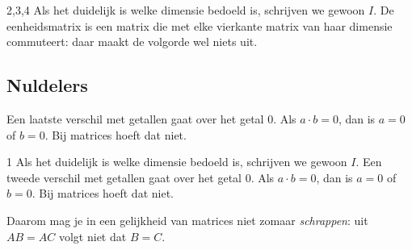 \begin{alleenvoor}{2,3,4}
Als het duidelijk is welke dimensie bedoeld is, schrijven we gewoon $I$. De eenheidsmatrix is een matrix die met elke vierkante matrix van haar dimensie commuteert: daar maakt de volgorde wel niets uit.

\subsection{Nuldelers}

Een laatste verschil met getallen gaat over het getal 0. Als $a \cdot b = 0$, dan is $a = 0$ of $b = 0$. Bij matrices hoeft dat niet.
\end{alleenvoor}
\begin{alleenvoor}{1}
Als het duidelijk is welke dimensie bedoeld is, schrijven we gewoon $I$. Een tweede verschil met getallen gaat over het getal 0. Als $a \cdot b = 0$, dan is $a = 0$ of $b = 0$. Bij matrices hoeft dat niet.
\end{alleenvoor}


Daarom mag je in een gelijkheid van matrices niet zomaar \textit{schrappen}: uit $AB = AC$ volgt niet dat $B = C$.

